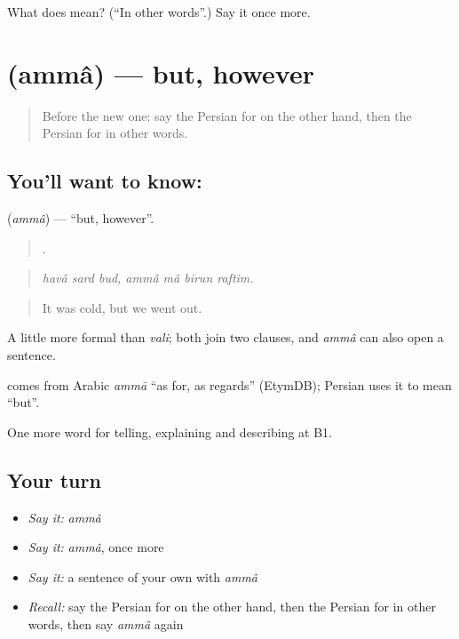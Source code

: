 \begin{tcolorbox}[breakable,colback=teal!4,colframe=teal!35!black,title={Before you move on}]
What does    mean? (\textquotedblleft{}In other words\textquotedblright{}.) Say it once more.
\end{tcolorbox}
\section[\texorpdfstring{\fa{اما} (ammâ)}{اما (ammâ)}]{ (ammâ) — but, however}

\label{lesson:FA-C367-amma}



\begin{quote}
Before the new one: say the Persian for on the other hand, then the Persian for in other words.
\end{quote}

\subsection*{You'll want to know: }
\textbf{} (\emph{ammâ}) — \textquotedblleft{}but, however\textquotedblright{}.

\begin{quote}
      .
\end{quote}

\begin{quote}
\emph{havâ sard bud, ammâ mâ birun raftim.}
\end{quote}

\begin{quote}
It was cold, but we went out.
\end{quote}

A little more formal than \emph{vali}; both join two clauses, and \emph{ammâ} can also open a sentence.

\begin{cousinweb}
\textbf{} comes from Arabic \emph{ammā} \textquotedblleft{}as for, as regards\textquotedblright{} (EtymDB); Persian uses it to mean \textquotedblleft{}but\textquotedblright{}.
\end{cousinweb}

\begin{grammarlens}[title={What you've built}]
One more word for telling, explaining and describing at B1.
\end{grammarlens}

\subsection*{Your turn}
\begin{itemize}
\raggedright
  \item \emph{Say it:} \emph{ammâ}
  \item \emph{Say it:} \emph{ammâ}, once more
  \item \emph{Say it:} a sentence of your own with \emph{ammâ}
  \item \emph{Recall:} say the Persian for on the other hand, then the Persian for in other words, then say \emph{ammâ} again
\end{itemize}

